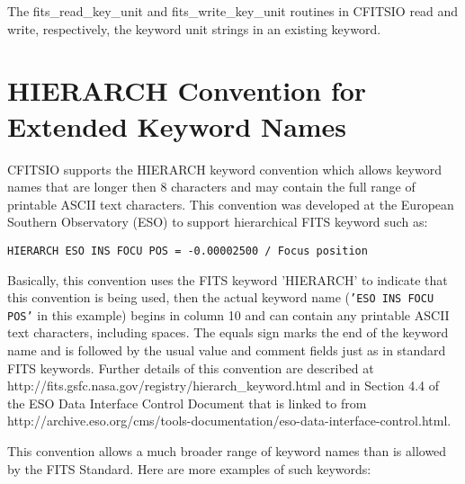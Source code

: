 \documentclass[11pt]{book}
\begin{document}
The fits\_read\_key\_unit and fits\_write\_key\_unit routines in
CFITSIO read and write, respectively, the keyword unit strings in an
existing keyword.


\section{HIERARCH Convention for Extended Keyword Names}

CFITSIO supports the HIERARCH keyword convention which allows keyword
names that are longer then 8 characters and may contain the full range
of printable ASCII text characters.  This convention
was developed at the European Southern Observatory (ESO)  to support
hierarchical FITS keyword such as:

\begin{verbatim}
HIERARCH ESO INS FOCU POS = -0.00002500 / Focus position
\end{verbatim}
Basically, this convention uses the FITS keyword 'HIERARCH' to indicate
that this convention is being used, then the actual keyword name
({\tt'ESO INS FOCU POS'} in this example) begins in column 10 and can
contain any printable ASCII text characters, including spaces.  The
equals sign marks the end of the keyword name and is followed by the
usual value and comment fields just as in standard FITS keywords.
Further details of this convention are described at
http://fits.gsfc.nasa.gov/registry/hierarch\_keyword.html
and in Section 4.4 of the ESO Data Interface Control Document that
is linked to from
http://archive.eso.org/cms/tools-documentation/eso-data-interface-control.html.

This convention allows a much broader range of keyword names
than is allowed by the FITS Standard.  Here are more examples
of such keywords:
\end{document}
